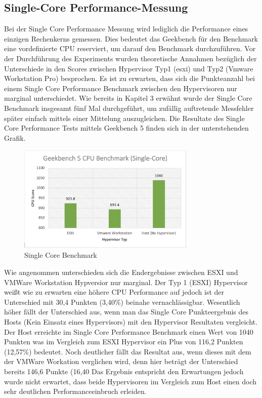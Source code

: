 \documentclass[conference]{IEEEtran}
\begin{document}
\subsection{Single-Core Performance-Messung}
Bei der Single Core Performance Messung wird lediglich die Performance eines einzigen Rechenkerns gemessen. Dies bedeutet das Geekbench für den Benchmark eine vordefinierte CPU reserviert, um darauf den Benchmark durchzuführen. Vor der Durchführung des Experiments wurden theoretische Annahmen bezüglich der Unterschiede in den Scores zwischen Hypervisor Typ1 (esxi) und Typ2 (Vmware Workstation Pro) besprochen. Es ist zu erwarten, dass sich die Punkteanzahl bei einem Single Core Performance Benchmark zwischen den Hypervisoren nur marginal unterschiedet.
Wie bereits in Kapitel 3 erwähnt wurde der Single Core Benchmark insgesamt fünf Mal durchgeführt, um zufällig auftretende Messfehler später einfach mittels einer Mittelung auszugleichen. Die Resultate des Single Core Performance Tests mittels Geekbench 5 finden sich in der unterstehenden Grafik. \newline 

\begin{figure}[!h]
	\centering
	\includegraphics[keepaspectratio,width=8.5cm,height=0.75\textheight]{singlecore.png}
	\caption{Single Core Benchmark}
	\label{architecture}
\end{figure}

Wie angenommen unterschieden sich die Endergebnisse zwischen ESXI und VMWare Workstation Hypversior nur marginal. Der Typ 1 (ESXI) Hypervisor weißt wie zu erwarten eine höhere CPU Performance auf jedoch ist der Unterschied mit 30,4 Punkten (3,40\%) beinahe vernachlässigbar. Wesentlich höher fällt der Unterschied aus, wenn man das Single Core Punkteergebnis des Hosts (Kein Einsatz eines Hypervisors) mit den Hypervisor Resultaten vergleicht. Der Host erreichte im Single Core Performance Benchmark einen Wert von 1040 Punkten was im Vergleich zum ESXI Hypervisor ein Plus von 116,2 Punkten (12,57\%) bedeutet. Noch deutlicher fällt das Resultat aus, wenn dieses mit dem der VMWare Workation verglichen wird, denn hier beträgt der Unterschied bereits 146,6 Punkte (16,40%
Das Ergebnis entspricht den Erwartungen jedoch wurde nicht erwartet, dass beide Hypervisoren im Vergleich zum Host einen doch sehr deutlichen Performanceeinbruch erleiden.
\end{document}
